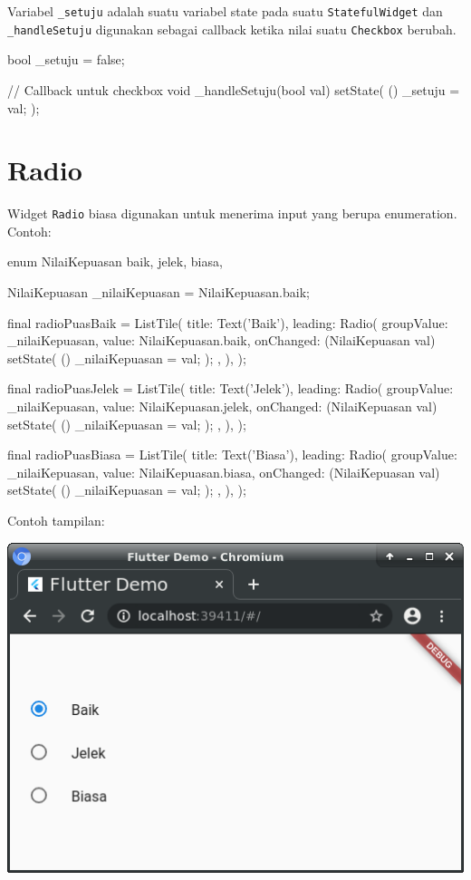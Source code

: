 \documentclass[a4paper,11pt]{article} %
\newcommand{\txtinline}[1]{\texttt{#1}}
\begin{document}
Variabel \txtinline{_setuju} adalah suatu variabel state pada
suatu \txtinline{StatefulWidget} dan \txtinline{_handleSetuju}
digunakan sebagai callback ketika nilai suatu \txtinline{Checkbox}
berubah.
\begin{dartcode}
bool _setuju = false;

// Callback untuk checkbox
void _handleSetuju(bool val) {
  setState( () {
    _setuju = val;
  });
}
\end{dartcode}

\section{Radio}
Widget \txtinline{Radio} biasa digunakan untuk menerima input yang berupa enumeration.
Contoh:
\begin{dartcode}

enum NilaiKepuasan { 
  baik,
  jelek,
  biasa,
}

NilaiKepuasan _nilaiKepuasan = NilaiKepuasan.baik;

final radioPuasBaik = ListTile(
  title: Text('Baik'), 
  leading: Radio(
    groupValue: _nilaiKepuasan,
    value: NilaiKepuasan.baik,
    onChanged: (NilaiKepuasan val) {
      setState( () {
        _nilaiKepuasan = val;
      });
    },
  ),
);

final radioPuasJelek = ListTile(
  title: Text('Jelek'), 
  leading: Radio(
    groupValue: _nilaiKepuasan,
    value: NilaiKepuasan.jelek,
    onChanged: (NilaiKepuasan val) {
      setState( () {
        _nilaiKepuasan = val;
      });
    },
  ),
);

final radioPuasBiasa = ListTile(
  title: Text('Biasa'), 
  leading: Radio(
    groupValue: _nilaiKepuasan,
    value: NilaiKepuasan.biasa,
    onChanged: (NilaiKepuasan val) {
      setState( () {
        _nilaiKepuasan = val;
      });
    },
  ),
);
\end{dartcode}

Contoh tampilan:

{\centering
\includegraphics[scale=0.5]{images/RadioBox1.png}
\par}
\end{document}
